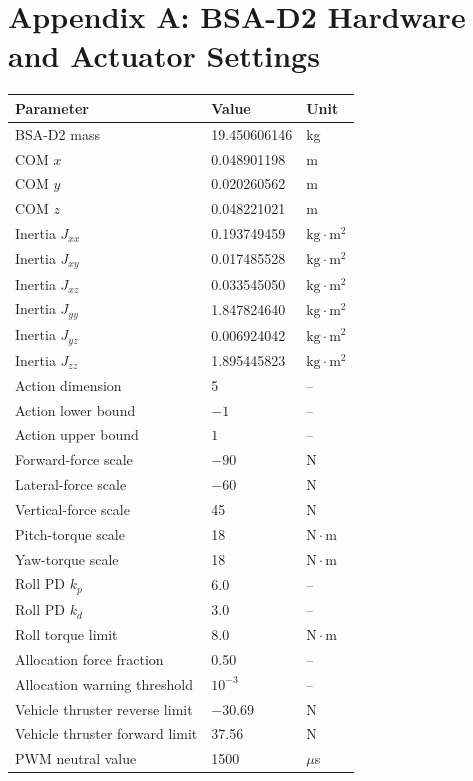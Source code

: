 \documentclass[11pt]{article}
\begin{document}
\section*{Appendix A: BSA-D2 Hardware and Actuator Settings}

\begin{center}
\footnotesize
\begin{tabularx}{\textwidth}{@{}Z M M@{}}
\toprule
Parameter & Value & Unit \\
\midrule
BSA-D2 mass & 19.450606146 & kg \\
COM $x$ & 0.048901198 & m \\
COM $y$ & 0.020260562 & m \\
COM $z$ & 0.048221021 & m \\
Inertia $J_{xx}$ & 0.193749459 & $\mathrm{kg}\cdot\mathrm{m}^2$ \\
Inertia $J_{xy}$ & 0.017485528 & $\mathrm{kg}\cdot\mathrm{m}^2$ \\
Inertia $J_{xz}$ & 0.033545050 & $\mathrm{kg}\cdot\mathrm{m}^2$ \\
Inertia $J_{yy}$ & 1.847824640 & $\mathrm{kg}\cdot\mathrm{m}^2$ \\
Inertia $J_{yz}$ & 0.006924042 & $\mathrm{kg}\cdot\mathrm{m}^2$ \\
Inertia $J_{zz}$ & 1.895445823 & $\mathrm{kg}\cdot\mathrm{m}^2$ \\
Action dimension & 5 & -- \\
Action lower bound & $-1$ & -- \\
Action upper bound & $1$ & -- \\
Forward-force scale & $-90$ & N \\
Lateral-force scale & $-60$ & N \\
Vertical-force scale & 45 & N \\
Pitch-torque scale & 18 & $\mathrm{N}\cdot\mathrm{m}$ \\
Yaw-torque scale & 18 & $\mathrm{N}\cdot\mathrm{m}$ \\
Roll PD $k_p$ & 6.0 & -- \\
Roll PD $k_d$ & 3.0 & -- \\
Roll torque limit & 8.0 & $\mathrm{N}\cdot\mathrm{m}$ \\
Allocation force fraction & 0.50 & -- \\
Allocation warning threshold & $10^{-3}$ & -- \\
Vehicle thruster reverse limit & $-30.69$ & N \\
Vehicle thruster forward limit & 37.56 & N \\
PWM neutral value & 1500 & $\mu$s \\
\bottomrule
\end{tabularx}
\end{center}
\end{document}

